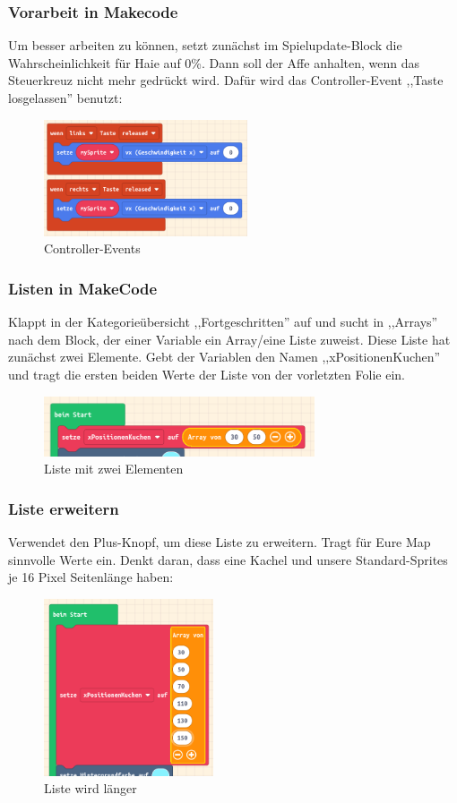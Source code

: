 \documentclass{beamer}
\begin{document}
\begin{frame}
\frametitle{Vorarbeit in Makecode}

Um besser arbeiten zu können, setzt zunächst im Spielupdate-Block die Wahrscheinlichkeit für Haie auf 0\%. Dann soll der Affe anhalten, wenn das Steuerkreuz nicht mehr gedrückt wird. Dafür wird das Controller-Event ,,Taste losgelassen'' benutzt:

 \begin{figure}
  \includegraphics[width=6cm]{game39.png}
  \caption{Controller-Events}
  \label{fig:game39}
\end{figure}

\end{frame}

\begin{frame}
 \frametitle{Listen in MakeCode}
 
Klappt in der Kategorieübersicht ,,Fortgeschritten'' auf und sucht in ,,Arrays'' nach dem Block, der einer Variable ein Array/eine Liste  zuweist. Diese Liste hat zunächst zwei Elemente. Gebt der Variablen den Namen ,,xPositionenKuchen'' und tragt die ersten beiden Werte der Liste von der vorletzten Folie ein. 

  \begin{figure}
  \includegraphics[width=8cm]{game40.png}
  \caption{Liste mit zwei Elementen}
  \label{fig:game40}
\end{figure}

 
\end{frame}

\begin{frame}
 \frametitle{Liste erweitern}
 
Verwendet den Plus-Knopf, um diese Liste zu erweitern. Tragt für Eure Map sinnvolle Werte ein. Denkt daran, dass eine Kachel und unsere Standard-Sprites je 16 Pixel Seitenlänge haben:

\begin{figure}
  \includegraphics[width=5cm]{game41.png}
  \caption{Liste wird länger}
  \label{fig:game41}
\end{figure}
\end{frame}
\end{document}
